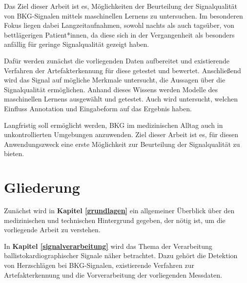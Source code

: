 Das Ziel dieser Arbeit ist es, Möglichkeiten der Beurteilung der Signalqualität von \ac{BKG}-Signalen mittels maschinellen Lernens zu untersuchen. Im besonderen Fokus liegen dabei Langzeitaufnahmen, sowohl nachts als auch tagsüber, von bettlägerigen Patient*innen, da diese sich in der Vergangenheit als besonders anfällig für geringe Signalqualität gezeigt haben.

Dafür werden zunächst die vorliegenden Daten aufbereitet und existierende Verfahren der Artefakterkennung für diese getestet und bewertet. Anschließend wird das Signal auf mögliche Merkmale untersucht, die Aussagen über die Signalqualität ermöglichen. Anhand dieses Wissens werden Modelle des maschinellen Lernens ausgewählt und getestet. Auch wird untersucht, welchen Einfluss Annotation und Eingabeform auf das Ergebnis haben.

Langfristig soll ermöglicht werden, \acf{BKG} im medizinischen Alltag auch in unkontrollierten Umgebungen anzuwenden. Ziel dieser Arbeit ist es, für diesen Anwendungszweck eine erste Möglichkeit zur Beurteilung der Signalqualität zu bieten.%

\section{Gliederung}

Zunächst wird in \textbf{Kapitel \ref{grundlagen}} ein allgemeiner Überblick über den medizinischen und technischen Hintergrund gegeben, der nötig ist, um die vorliegende Arbeit zu verstehen.

In \textbf{Kapitel \ref{signalverarbeitung}} wird das Thema der Verarbeitung ballistokardiographischer Signale näher betrachtet. Dazu gehört die Detektion von Herzschlägen bei \ac{BKG}-Signalen, existierende Verfahren zur Artefakterkennung und die Vorverarbeitung der vorliegenden Messdaten.


